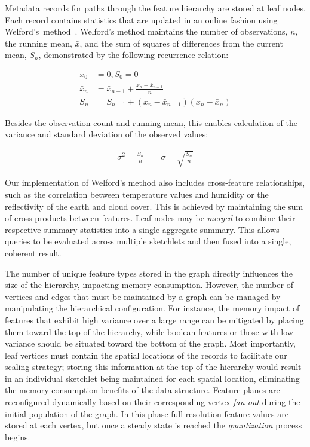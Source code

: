 Metadata records for paths through the feature hierarchy are stored at leaf nodes. Each record contains statistics that are updated in an online fashion using Welford's~method~\cite{welford1962note}. Welford's method maintains the number of observations, $n$, the running mean, $\bar{x}$, and the sum of squares of differences from the current mean, $S_n$, demonstrated by the following recurrence relation:

\begin{align*}
    \bar{x}_0 &= 0, S_0 = 0 \\
    \bar{x}_n &= \bar{x}_{n - 1} + \frac{x_n - \bar{x}_{n - 1}}{n} \\
    S_n       &= S_{n - 1} + (x_n - \bar{x}_{n - 1})(x_n - \bar{x}_n)
\end{align*}

Besides the observation count and running mean, this enables calculation of the variance and standard deviation of the observed values:

\begin{align*}
    \sigma^2 = \frac{S_n}{n} \hspace{2em} \sigma = \sqrt{\frac{S_n}{n}}
\end{align*}

Our implementation of Welford's method also includes cross-feature relationships, such as the correlation between temperature values and humidity or the reflectivity of the earth and cloud cover. This is achieved by maintaining the sum of cross products between features. Leaf nodes may be \emph{merged} to combine their respective summary statistics into a single aggregate summary. This allows queries to be evaluated across multiple sketchlets and then fused into a single, coherent result.

The number of unique feature types stored in the graph directly influences the size of the hierarchy, impacting memory consumption. However, the number of vertices and edges that must be maintained by a graph can be managed by manipulating the hierarchical configuration. For instance, the memory impact of features that exhibit high variance over a large range can be mitigated by placing them toward the top of the hierarchy, while boolean features or those with low variance should be situated toward the bottom of the graph. Most importantly, leaf vertices must contain the spatial locations of the records to facilitate our scaling strategy; storing this information at the top of the hierarchy would result in an individual sketchlet being maintained for each spatial location, eliminating the memory consumption benefits of the data structure. Feature planes are reconfigured dynamically based on their corresponding vertex \emph{fan-out} during the initial population of the graph. In this phase full-resolution feature values are stored at each vertex, but once a steady state is reached the \emph{quantization} process begins.

